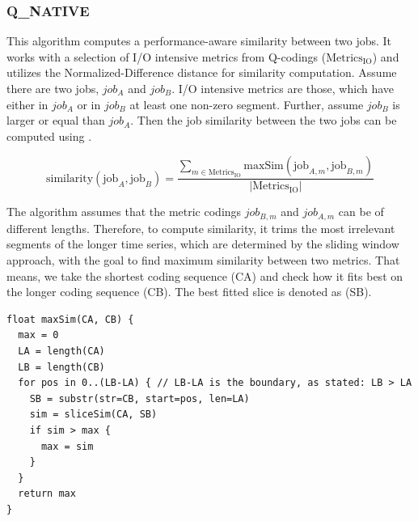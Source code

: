 \documentclass{jhps}
\begin{document}
\FloatBarrier
\subsubsection{Q\_NATIVE}
This algorithm computes a performance-aware similarity between two jobs.
It works with a selection of I/O intensive metrics from Q-codings ($\text{Metrics}_{\text{IO}}$) and utilizes the Normalized-Difference distance for similarity computation.
Assume there are two jobs, $job_A$ and $job_B$.
I/O intensive metrics are those, which have either in $job_A$ or in $job_B$ at least one non-zero segment.
Further, assume $job_B$ is larger or equal than $job_A$.
Then the job similarity between the two jobs can be computed using .

\begin{equation}
  \text{similarity}\left(\text{job}_{A},\text{job}_{B} \right) = \frac{ \sum_{m \in \text{Metrics}_{\text{IO}}}^{} {\text{maxSim} \left( \text{job}_{A,m}, \text{job}_{B,m} \right)}}{|\text{Metrics}_{\text{IO}}|}
  \label{eq:hexn}
\end{equation}

The algorithm assumes that the metric codings $job_{B,m}$ and $job_{A,m}$ can be of different lengths.
Therefore, to compute similarity, it trims the most irrelevant segments of the longer time series, which are determined by the sliding window approach, with the goal to find maximum similarity between two metrics.
That means, we take the shortest coding sequence (CA) and check how it fits best on the longer coding sequence (CB).
The best fitted slice is denoted as (SB).

\begin{lstlisting}[caption={Pseudo code of the maxSim() function}]
float maxSim(CA, CB) {
  max = 0
  LA = length(CA)
  LB = length(CB)
  for pos in 0..(LB-LA) { // LB-LA is the boundary, as stated: LB > LA
    SB = substr(str=CB, start=pos, len=LA)
    sim = sliceSim(CA, SB)
    if sim > max {
      max = sim
    }
  }
  return max
}
\end{lstlisting}
\end{document}
